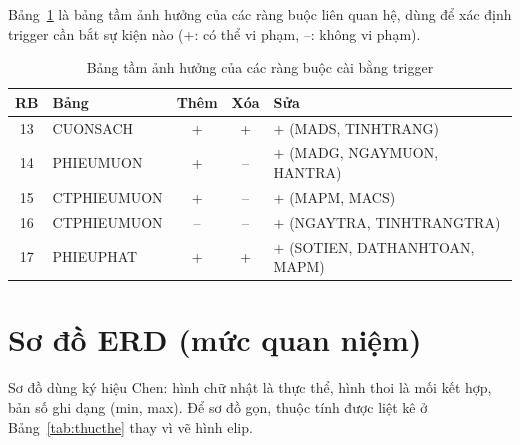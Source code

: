 \documentclass[a4paper,oneside]{report}
\begin{document}
Bảng~\ref{tab:tahbuong} là bảng tầm ảnh hưởng của các ràng buộc liên quan hệ, dùng để xác định trigger cần bắt sự kiện nào (+: có thể vi phạm, –: không vi phạm).

\begin{table}[!htbp]
\centering\small
\caption{Bảng tầm ảnh hưởng của các ràng buộc cài bằng trigger}
\label{tab:tahbuong}
\begin{tabular}{|c|l|c|c|l|}
\hline
\textbf{RB} & \textbf{Bảng} & \textbf{Thêm} & \textbf{Xóa} & \textbf{Sửa}\\\hline
13 & CUONSACH & + & + & + (MADS, TINHTRANG)\\\hline
14 & PHIEUMUON & + & – & + (MADG, NGAYMUON, HANTRA)\\\hline
15 & CTPHIEUMUON & + & – & + (MAPM, MACS)\\\hline
16 & CTPHIEUMUON & – & – & + (NGAYTRA, TINHTRANGTRA)\\\hline
17 & PHIEUPHAT & + & + & + (SOTIEN, DATHANHTOAN, MAPM)\\\hline
\end{tabular}
\end{table}

\section{Sơ đồ ERD (mức quan niệm)}
Sơ đồ dùng ký hiệu Chen: hình chữ nhật là thực thể, hình thoi là mối kết hợp, bản số ghi dạng (min, max). Để sơ đồ gọn, thuộc tính được liệt kê ở Bảng~\ref{tab:thucthe} thay vì vẽ hình elip.
\end{document}
